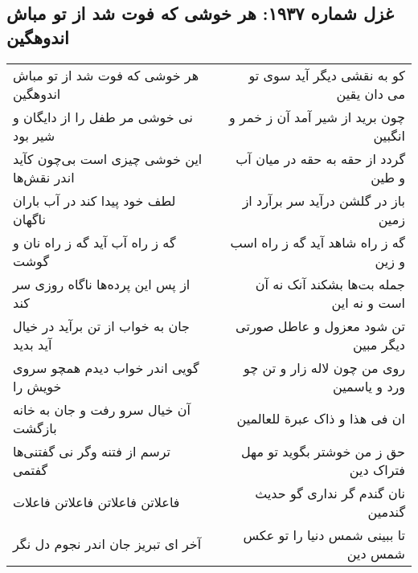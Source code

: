 \begin{center}
\section*{غزل شماره ۱۹۳۷: هر خوشی که فوت شد از تو مباش اندوهگین}
\label{sec:1937}
\begin{longtable}{l p{0.5cm} r}
هر خوشی که فوت شد از تو مباش اندوهگین
&&
کو به نقشی دیگر آید سوی تو می دان یقین
\\
نی خوشی مر طفل را از دایگان و شیر بود
&&
چون برید از شیر آمد آن ز خمر و انگبین
\\
این خوشی چیزی است بی‌چون کآید اندر نقش‌ها
&&
گردد از حقه به حقه در میان آب و طین
\\
لطف خود پیدا کند در آب باران ناگهان
&&
باز در گلشن درآید سر برآرد از زمین
\\
گه ز راه آب آید گه ز راه نان و گوشت
&&
گه ز راه شاهد آید گه ز راه اسب و زین
\\
از پس این پرده‌ها ناگاه روزی سر کند
&&
جمله بت‌ها بشکند آنک نه آن است و نه این
\\
جان به خواب از تن برآید در خیال آید بدید
&&
تن شود معزول و عاطل صورتی دیگر مبین
\\
گویی اندر خواب دیدم همچو سروی خویش را
&&
روی من چون لاله زار و تن چو ورد و یاسمین
\\
آن خیال سرو رفت و جان به خانه بازگشت
&&
ان فی هذا و ذاک عبرة للعالمین
\\
ترسم از فتنه وگر نی گفتنی‌ها گفتمی
&&
حق ز من خوشتر بگوید تو مهل فتراک دین
\\
فاعلاتن فاعلاتن فاعلاتن فاعلات
&&
نان گندم گر نداری گو حدیث گندمین
\\
آخر ای تبریز جان اندر نجوم دل نگر
&&
تا ببینی شمس دنیا را تو عکس شمس دین
\\
\end{longtable}
\end{center}
